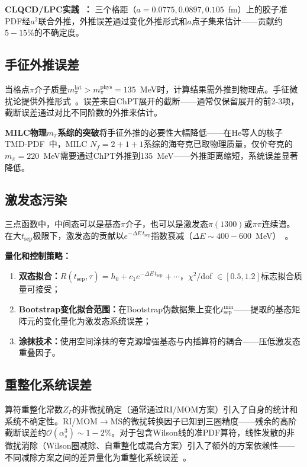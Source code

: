 \documentclass[12pt,a4paper]{ctexart}
\begin{document}
\textbf{CLQCD/LPC实践~\cite{Chen2025gluon}：} 三个格距（$a=0.0775, 0.0897, 0.105$~fm）上的胶子准PDF经$a^2$联合外推，外推误差通过变化外推形式和$a$点子集来估计——贡献约$5-15\%$的不确定度。

\subsection{手征外推误差}

当格点$\pi$介子质量$m_\pi^{\text{lat}} > m_\pi^{\text{phys}} = 135$~MeV时，计算结果需外推到物理点。手征微扰论提供外推形式~\cite{GattringerLang2010}。误差来自ChPT展开的截断——通常仅保留展开的前2-3项，截断误差通过对比不同阶数的外推来估计。

\textbf{MILC物理$m_\pi$系综的突破}将手征外推的必要性大幅降低——在He等人的核子TMD-PDF~\cite{He2024unpolTMD}中，MILC $N_f=2+1+1$系综的海夸克已取物理质量，仅价夸克的$m_\pi=220$~MeV需要通过ChPT外推到135~MeV——外推距离缩短，系统误差显著降低。

\subsection{激发态污染}

三点函数中，中间态可以是基态$\pi$介子，也可以是激发态$\pi(1300)$或$\pi\pi$连续谱。在大$t_{\text{sep}}$极限下，激发态的贡献以$e^{-\Delta E\,t_{\text{sep}}}$指数衰减（$\Delta E\sim 400-600$~MeV）~\cite{GattringerLang2010,He2024unpolTMD}。

\textbf{量化和控制策略：}
\begin{enumerate}[nosep]
    \item \textbf{双态拟合：}$R(t_{\text{sep}},\tau) = h_0 + c_1 e^{-\Delta E\,t_{\text{sep}}} + \cdots$，$\chi^2/$dof $\in [0.5, 1.2]$标志拟合质量可接受；
    \item \textbf{Bootstrap变化拟合范围：}在Bootstrap伪数据集上变化$t_{\text{sep}}^{\min}$——提取的基态矩阵元的变化量化为激发态系统误差；
    \item \textbf{涂抹技术：}使用空间涂抹的夸克源增强基态与内插算符的耦合——压低激发态重叠因子。
\end{enumerate}

\subsection{重整化系统误差}

算符重整化常数$Z_\Gamma$的非微扰确定（通常通过RI/MOM方案）引入了自身的统计和系统不确定性。RI/MOM$\to\overline{\text{MS}}$的微扰转换因子已知到三圈精度——残余的高阶截断误差约$\mathcal{O}(\alpha_s^3) \sim 1-2\%$。对于包含Wilson线的准PDF算符，线性发散的非微扰消除（Wilson圈减除、自重整化或混合方案）引入了额外的方案依赖性——不同减除方案之间的差异量化为重整化系统误差~\cite{Huo2021self,Zhang2022renormTMD}。
\end{document}
